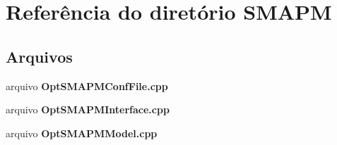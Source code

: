 \section{Referência do diretório S\+M\+A\+PM}
\label{dir_6caf5509f4410f2aa1ec5bfd23b90b49}
\subsection*{Arquivos}
\begin{DoxyCompactItemize}
\item 
arquivo {\bf Opt\+S\+M\+A\+P\+M\+Conf\+File.\+cpp}
\item 
arquivo {\bf Opt\+S\+M\+A\+P\+M\+Interface.\+cpp}
\item 
arquivo {\bf Opt\+S\+M\+A\+P\+M\+Model.\+cpp}
\end{DoxyCompactItemize}
